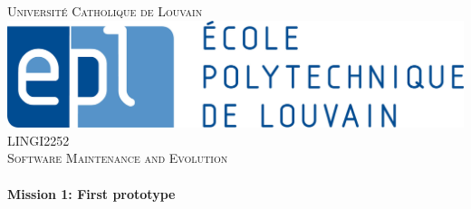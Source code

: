     \begin{titlepage}
        \center %


        \textsc{\LARGE Université Catholique de Louvain }\\[0.8cm] %
        \includegraphics[scale=0.45]{epl.jpg}
        \\[1.5cm]
        \textsc{\Large LINGI2252}\\[0.5cm] %
        \textsc{\large Software Maintenance and Evolution}\\[0.8cm] %


        \HRule \\[0.4cm]
        { \huge \bfseries Mission 1: First prototype}\\[0.2cm] %
        \HRule \\[1.5cm]



\end{titlepage}
